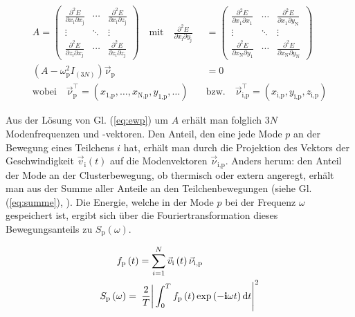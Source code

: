 \documentclass[numbers=noenddot,a4paper,notitlepage,twoside,BCOR15mm]{scrbook}
\newcommand{\diff}{\textnormal{d}}
\newcommand{\ix}[1]{_\text{#1}}
\newcommand{\imag}{\mathbf{i}}
\begin{document}
						\begin{align}
							A=
							\begin{pmatrix}
							\frac{\partial^2 E}{\partial x\ix{i} \partial x\ix{j}} & \cdots & \frac{\partial^2 E}{\partial x\ix{i} \partial z\ix{j}} \\ 
							\vdots & \ddots & \vdots \\ 
							\frac{\partial^2 E}{\partial z\ix{i} \partial x\ix{j}} & \cdots & \frac{\partial^2 E}{\partial z\ix{i} \partial z\ix{j}}
							\end{pmatrix} 
							\quad \text{mit} \quad \frac{\partial^2 E}{\partial x\ix{i}\partial y\ix{j}}&=
							\begin{pmatrix}
							\frac{\partial^2 E}{\partial x\ix{1} \partial x\ix{1}} & \cdots & \frac{\partial^2 E}{\partial x\ix{1} \partial y\ix{N}} \\ 
							\vdots & \ddots & \vdots \\ 
							\frac{\partial^2 E}{\partial x\ix{N} \partial y\ix{1}} & \cdots & \frac{\partial^2 E}{\partial x\ix{N} \partial y\ix{N}}
							\end{pmatrix}
							\label{eq:matrix} \\
							\left(A-\omega\ix{p}^2I_{(3N)}\right)\vec{\nu}\ix{p}&=0 \label{eq:ewp} \\ 
							\text{wobei} \quad \vec{\nu}\ix{p}^\top=\left(x\ix{1,p},\dots,x\ix{N,p},y\ix{1,p},\dots\right) \quad &\text{bzw.} \quad \vec{\nu}\ix{i,p}^\top=\left(x\ix{i,p},y\ix{i,p},z\ix{i,p}\right) \nonumber
						\end{align}

					Aus der Lösung von Gl. (\ref{eq:ewp}) um $A$ erhält man folglich $3N$ Modenfrequenzen und -vektoren. Den Anteil, den eine jede Mode $p$ an der Bewegung eines Teilchens $i$ hat, erhält man durch die Projektion des Vektors der Geschwindigkeit $\vec{v}\ix{i}\left(t\right)$ auf die Modenvektoren $\vec{\nu}\ix{i,p}$. Anders herum: den Anteil der Mode an der Clusterbewegung, ob thermisch oder extern angeregt, erhält man aus der Summe aller Anteile an den Teilchenbewegungen (siehe Gl. (\ref{eq:summe}), \cite{Melzer03}). Die Energie, welche in der Mode $p$ bei der Frequenz $\omega$ gespeichert ist, ergibt sich über die Fouriertransformation dieses Bewegungsanteils zu $S\ix{p}\left(\omega\right)$.

						\begin{align}
							f\ix{p}&\left(t\right)=\sum_{i=1}^{N}\vec{v}\ix{i}\left(t\right)\vec{\nu}\ix{i,p} \label{eq:summe} \\
							S\ix{p}\left(\omega\right)&=\left.\left.\frac{2}{T}\right|\int_{0}^{T}f\ix{p}\left(t\right)\exp\left(-\imag\omega t\right)\diff t\right|^2 \label{eq:energiedicht}
						\end{align}
\end{document}
